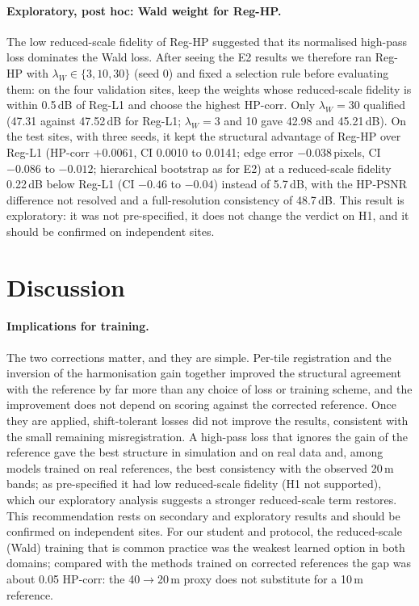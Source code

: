 \documentclass[pdflatex,sn-basic,referee,lineno]{sn-jnl}
\begin{document}
\paragraph{Exploratory, post hoc: Wald weight for Reg-HP.} The low reduced-scale fidelity of Reg-HP suggested that
its normalised high-pass loss dominates the Wald loss. After seeing the E2 results we therefore ran Reg-HP with
$\lambda_W\in\{3,10,30\}$ (seed 0) and fixed a selection rule before evaluating them: on the four validation sites,
keep the weights whose reduced-scale fidelity is within 0.5\,dB of Reg-L1 and choose the highest HP-corr. Only
$\lambda_W=30$ qualified (47.31 against 47.52\,dB for Reg-L1; $\lambda_W=3$ and 10 gave 42.98 and 45.21\,dB). On the
test sites, with three seeds, it kept the structural advantage of Reg-HP over Reg-L1 (HP-corr $+0.0061$, CI 0.0010
to 0.0141; edge error $-0.038$\,pixels, CI $-0.086$ to $-0.012$; hierarchical bootstrap as for E2) at a reduced-scale
fidelity 0.22\,dB below Reg-L1 (CI $-0.46$ to $-0.04$) instead of 5.7\,dB, with the HP-PSNR difference not resolved
and a full-resolution consistency of 48.7\,dB. This result is exploratory: it was not
pre-specified, it does not change the verdict on H1, and it should be confirmed on independent sites.

\section{Discussion}\label{sec:discussion}

\paragraph{Implications for training.} The two corrections matter, and they are simple. Per-tile
registration and the inversion of the harmonisation gain together improved the structural agreement with the
reference by far more than any choice of loss or training scheme, and the improvement does not depend on scoring
against the corrected reference. Once they are applied, shift-tolerant losses did not improve the results, consistent with the small remaining
misregistration. A high-pass loss that ignores the gain of the reference gave the best structure in
simulation and on real data and, among models trained on real references, the best consistency with the observed
20\,m bands; as pre-specified it had low
reduced-scale fidelity (H1 not supported), which our exploratory analysis suggests a stronger reduced-scale term
restores. This recommendation rests on secondary and exploratory results and should be confirmed on independent
sites. For our student and protocol, the reduced-scale (Wald) training that is common practice was the
weakest learned option in both domains; compared with the methods trained on corrected references the gap was about
0.05 HP-corr: the 40$\to$20\,m proxy does not substitute for a 10\,m reference.
\end{document}
